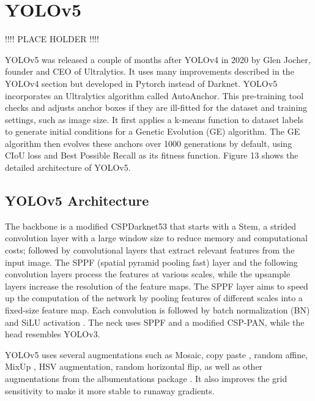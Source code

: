 \documentclass{article}
\begin{document}
\section{YOLOv5}

!!!! PLACE HOLDER !!!!

YOLOv5 \cite{Jocher_YOLOv5_by_Ultralytics_2020} was released a couple of months after YOLOv4 in 2020 by Glen Jocher, founder and CEO of Ultralytics. It uses many improvements described in the YOLOv4 section but developed in Pytorch instead of Darknet. YOLOv5 incorporates an Ultralytics algorithm called AutoAnchor. This pre-training tool checks and adjusts anchor boxes if they are ill-fitted for the dataset and training settings, such as image size. It first applies a k-means function to dataset labels to generate initial conditions for a Genetic Evolution (GE) algorithm. The GE algorithm then evolves these anchors over 1000 generations by default, using CIoU loss \cite{zheng2020distance} and Best Possible Recall as its fitness function. Figure 13 shows the detailed architecture of YOLOv5.

\subsection{YOLOv5 Architecture}


The backbone is a modified CSPDarknet53 that starts with a Stem, a strided convolution layer with a large window size to reduce memory and computational costs; followed by convolutional layers that extract relevant features from the input image. The SPPF (spatial pyramid pooling fast) layer and the following convolution layers process the features at various scales, while the upsample layers increase the resolution of the feature maps. The SPPF layer aims to speed up the computation of the network by pooling features of different scales into a fixed-size feature map. Each convolution is followed by batch normalization (BN) and SiLU activation \cite{hendrycks2016gaussian}. The neck uses SPPF and a modified CSP-PAN, while the head resembles YOLOv3.

YOLOv5 uses several augmentations such as Mosaic, copy paste \cite{ghiasi2021simple}, random affine, MixUp \cite{zhang2017mixup}, HSV augmentation, random horizontal flip, as well as other augmentations from the albumentations package \cite{buslaev2020albumentations}. It also improves the grid sensitivity to make it more stable to runaway gradients.
\end{document}
